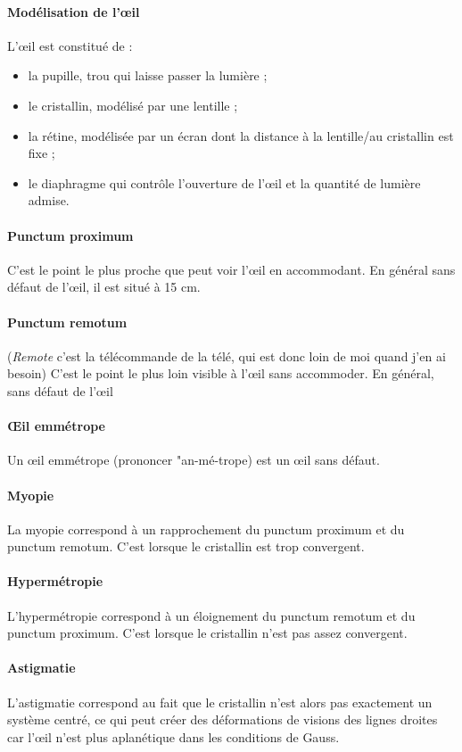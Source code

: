 \documentclass[french]{book}
\theoremstyle{plain}
\theoremstyle{definition}
\theoremstyle{remark}
\begin{document}
\paragraph{Modélisation de l'œil} L'œil est constitué de : 
\begin{itemize}
	\item la pupille, trou qui laisse passer la lumière ;
	\item le cristallin, modélisé par une lentille ;
	\item la rétine, modélisée par un écran dont la distance à la lentille/au cristallin est fixe ;
	\item le diaphragme qui contrôle l'ouverture de l'œil et la quantité de lumière admise. 
\end{itemize}
\paragraph{Punctum proximum} C'est le point le plus proche que peut voir l'œil en accommodant. En général sans défaut de l'œil, il est situé à 15 cm.
\paragraph{Punctum remotum} (\textit{Remote} c'est la télécommande de la télé, qui est donc loin de moi quand j'en ai besoin) C'est le point le plus loin visible à l'œil sans accommoder. En général, sans défaut de l'œil
\paragraph{Œil emmétrope} Un œil emmétrope (prononcer "an-mé-trope) est un œil sans défaut.
\paragraph{Myopie} La myopie correspond à un rapprochement du punctum proximum et du punctum remotum. C'est lorsque le cristallin est trop convergent.
\paragraph{Hypermétropie} L'hypermétropie correspond à un éloignement du punctum remotum et du punctum proximum. C'est lorsque le cristallin n'est pas assez convergent.
\paragraph{Astigmatie} L'astigmatie correspond au fait que le cristallin n'est alors pas exactement un système centré, ce qui peut créer des déformations de visions des lignes droites car l'œil n'est plus aplanétique dans les conditions de Gauss.
\end{document}
